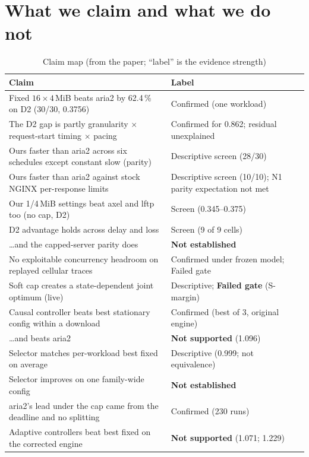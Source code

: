 \section{What we claim and what we do not}
{\small
\begin{longtable}{@{}>{\raggedright\arraybackslash}p{11.6cm}>{\raggedright\arraybackslash}p{4.0cm}@{}}
\caption{Claim map (from the paper; ``label'' is the evidence strength)}\label{tab:claims}\\
\toprule
\textbf{Claim} & \textbf{Label}\\
\midrule
\endhead
Fixed $16\times4$\,MiB beats aria2 by 62.4\,\% on D2 (30/30, 0.3756) & Confirmed (one workload)\\
The D2 gap is partly granularity $\times$ request-start timing $\times$ pacing & Confirmed for 0.862; residual unexplained\\
Ours faster than aria2 across six schedules except constant slow (parity) & Descriptive screen (28/30)\\
Ours faster than aria2 against stock NGINX per-response limits & Descriptive screen (10/10); N1 parity expectation not met\\
Our 1/4\,MiB settings beat axel and lftp too (no cap, D2) & Screen (0.345--0.375)\\
D2 advantage holds across delay and loss & Screen (9 of 9 cells)\\
\dots and the capped-server parity does & \textbf{Not established}\\
No exploitable concurrency headroom on replayed cellular traces & Confirmed under frozen model; Failed gate\\
Soft cap creates a state-dependent joint optimum (live) & Descriptive; \textbf{Failed gate} (S-margin)\\
Causal controller beats best stationary config within a download & Confirmed (best of 3, original engine)\\
\dots and beats aria2 & \textbf{Not supported} (1.096)\\
Selector matches per-workload best fixed on average & Descriptive (0.999; not equivalence)\\
Selector improves on one family-wide config & \textbf{Not established}\\
aria2's lead under the cap came from the deadline and no splitting & Confirmed (230 runs)\\
Adaptive controllers beat best fixed on the corrected engine & \textbf{Not supported} (1.071; 1.229)\\

\end{longtable}}
